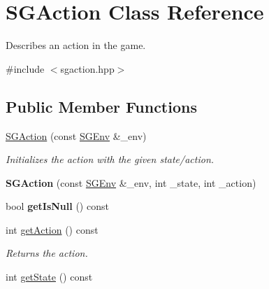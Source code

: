 \hypertarget{classSGAction}{\section{S\-G\-Action Class Reference}
\label{classSGAction}
}


Describes an action in the game.  




{\ttfamily \#include $<$sgaction.\-hpp$>$}

\subsection*{Public Member Functions}
\begin{DoxyCompactItemize}
\item 
\hypertarget{classSGAction_a2beea431eab0f867e6bb678c8649c3e0}{\hyperlink{classSGAction_a2beea431eab0f867e6bb678c8649c3e0}{S\-G\-Action} (const \hyperlink{classSGEnv}{S\-G\-Env} \&\-\_\-env)}\label{classSGAction_a2beea431eab0f867e6bb678c8649c3e0}

\begin{DoxyCompactList}\small\item\em Initializes the action with the given state/action. \end{DoxyCompactList}\item 
\hypertarget{classSGAction_a763b30d91b4ac060895b3af2731d097c}{{\bfseries S\-G\-Action} (const \hyperlink{classSGEnv}{S\-G\-Env} \&\-\_\-env, int \-\_\-state, int \-\_\-action)}\label{classSGAction_a763b30d91b4ac060895b3af2731d097c}

\item 
\hypertarget{classSGAction_aeb3fda5711922153dd8f694a4cd05167}{bool {\bfseries get\-Is\-Null} () const }\label{classSGAction_aeb3fda5711922153dd8f694a4cd05167}

\item 
\hypertarget{classSGAction_a669309713ab99e375da193bbfa6fc586}{int \hyperlink{classSGAction_a669309713ab99e375da193bbfa6fc586}{get\-Action} () const }\label{classSGAction_a669309713ab99e375da193bbfa6fc586}

\begin{DoxyCompactList}\small\item\em Returns the action. \end{DoxyCompactList}\item 
\hypertarget{classSGAction_a279af062730a81a022177740112c5f2d}{int \hyperlink{classSGAction_a279af062730a81a022177740112c5f2d}{get\-State} () const }\label{classSGAction_a279af062730a81a022177740112c5f2d}


\end{DoxyCompactItemize}
